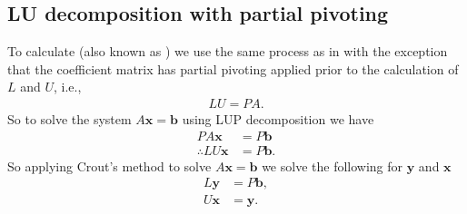 \documentclass[letterpaper,10pt,english]{jupyterBook}
\begin{document}
\subsection{LU decomposition with partial pivoting}
\label{\detokenize{6_Direct_methods/6.2_LUP_decomposition:lu-decomposition-with-partial-pivoting}}\label{\detokenize{6_Direct_methods/6.2_LUP_decomposition:lup-decomposition-section}}
\sphinxAtStartPar
To calculate  (also known as ) we use the same process as in {\hyperref[\detokenize{6_Direct_methods/6.1_LU_decomposition:lu-definition}]{}} with the exception that the coefficient matrix has partial pivoting applied prior to the calculation of \(L\) and \(U\), i.e.,
\begin{align*}
    LU = PA.
\end{align*}
\sphinxAtStartPar
So to solve the system \(A \mathbf{x} = \mathbf{b}\) using LUP decomposition we have
\begin{align*}
    PA \mathbf{x} &= P \mathbf{b} \\ 
    \therefore LU \mathbf{x} &= P \mathbf{b}.
\end{align*}
\sphinxAtStartPar
So applying Crout’s method to solve \(A \mathbf{x} = \mathbf{b}\) we solve the following for \(\mathbf{y}\) and \(\mathbf{x}\)
\begin{align*}
    L \mathbf{y} &= P \mathbf{b}, \\
    U \mathbf{x} &= \mathbf{y}.
\end{align*}
\end{document}
